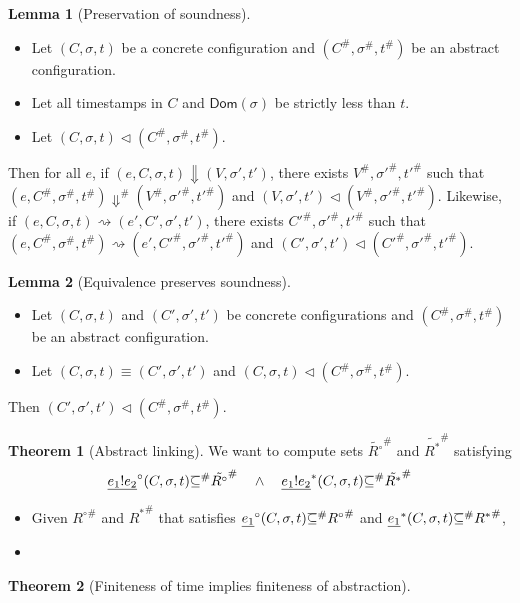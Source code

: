 \documentclass{article}
\theoremstyle{definition}
\newtheorem{lem}{Lemma}[section]
\newtheorem{thm}{Theorem}[section]
\def\ovbarw{1.2mu}
\def\ovbarh{0.8}
\newcommand*{\ovbar}[1]{\mkern \ovbarw\overline{\mkern-\ovbarw{\smash{#1}\scalebox{1}[\ovbarh]{\vphantom{i}}}\mkern-\ovbarw}\mkern \ovbarw}
\newcommand*{\A}[1]{{#1}^{\#}}
\newcommand*{\link}[2]{{#1}\mathtt{!}{#2}}
\newcommand*{\Reach}[1]{\underline{#1}^{*}}
\newcommand*{\Resolved}[1]{\underline{#1}^{\circ}}
\begin{document}
\begin{lem}[Preservation of soundness]
  $\:$

  \begin{itemize}
    \item Let $(C,\sigma,t)$ be a concrete configuration and $(C^{\#},\sigma^{\#},t^{\#})$ be an abstract configuration.
    \item Let all timestamps in $C$ and $\mathsf{Dom}(\sigma)$ be strictly less than $t$.
    \item Let $(C,\sigma,t)\lhd(\A{C},\A{\sigma},\A{t})$.
  \end{itemize}

  Then for all $e$, if $(e,C,\sigma,t)\Downarrow(V,\sigma',t')$, there exists $\A{V},\A{\sigma'},\A{t'}$ such that $(e,\A{C},\A{\sigma},\A{t})\A{\Downarrow}(\A{V},\A{\sigma'},\A{t'})$ and $(V,\sigma',t')\lhd(\A{V},\A{\sigma'},\A{t'})$.
  Likewise, if $(e,C,\sigma,t)\rightsquigarrow(e',C',\sigma',t')$, there exists $\A{C'},\A{\sigma'},\A{t'}$ such that $(e,\A{C},\A{\sigma},\A{t})\rightsquigarrow(e',\A{C'},\A{\sigma'},\A{t'})$ and $(C',\sigma',t')\lhd(\A{C'},\A{\sigma'},\A{t'})$.
\end{lem}

\begin{lem}[Equivalence preserves soundness]
  $\:$

  \begin{itemize}
    \item Let $(C,\sigma,t)$ and $(C',\sigma',t')$ be concrete configurations and $(C^{\#},\sigma^{\#},t^{\#})$ be an abstract configuration.
    \item Let $(C,\sigma,t)\equiv(C',\sigma',t')$ and $(C,\sigma,t)\lhd(\A{C},\A{\sigma},\A{t})$.
  \end{itemize}

  Then $(C',\sigma',t')\lhd(\A{C},\A{\sigma},\A{t})$.
\end{lem}

\begin{thm}[Abstract linking]
  We want to compute sets $\tilde{R^{\circ}}^{\#}$ and $\tilde{R^{*}}^{\#}$ satisfying
  \[
    \Resolved{\link{e_1}{e_2}}(C,\sigma,t)\ovbar{\subseteq}^{\#} \tilde{R^{\circ}}^{\#}
    \quad\wedge\quad
    \Reach{\link{e_1}{e_2}}(C,\sigma,t)\ovbar{\subseteq}^{\#} \tilde{R^{*}}^{\#}
  \]

  \begin{itemize}
    \item Given ${R^{\circ}}^{\#}$ and ${R^{*}}^{\#}$ that satisfies $\Resolved{e_1}(C,\sigma,t)\ovbar{\subseteq}^{\#} {R^{\circ}}^{\#}$ and $\Reach{e_1}(C,\sigma,t)\ovbar{\subseteq}^{\#} {R^{*}}^{\#}$,
    \item
  \end{itemize}
\end{thm}

\begin{thm}[Finiteness of time implies finiteness of abstraction]
\end{thm}

\printbibliography
\end{document}
